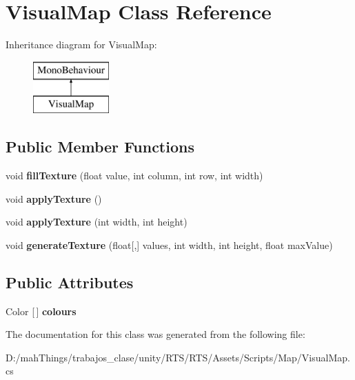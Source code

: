 \hypertarget{class_visual_map}{}\section{Visual\+Map Class Reference}
\label{class_visual_map}
Inheritance diagram for Visual\+Map\+:\begin{figure}[H]
\begin{center}
\leavevmode
\includegraphics[height=2.000000cm]{class_visual_map}
\end{center}
\end{figure}
\subsection*{Public Member Functions}
\begin{DoxyCompactItemize}
\item 
\mbox{\label{class_visual_map_a685aeff1a60eb854797e4b449ab68203}} 
void {\bfseries fill\+Texture} (float value, int column, int row, int width)
\item 
\mbox{\label{class_visual_map_ae7e29556b9ced1e31193c0baf64db2d6}} 
void {\bfseries apply\+Texture} ()
\item 
\mbox{\label{class_visual_map_a746cb4cc4977abb5f952f29e6095cf85}} 
void {\bfseries apply\+Texture} (int width, int height)
\item 
\mbox{\label{class_visual_map_a0adc17e3e2ce0b909c1f99c14056490a}} 
void {\bfseries generate\+Texture} (float\mbox{[},\mbox{]} values, int width, int height, float max\+Value)
\end{DoxyCompactItemize}
\subsection*{Public Attributes}
\begin{DoxyCompactItemize}
\item 
\mbox{\label{class_visual_map_a3a25edd83daa0a3fd85c20ee2af716f6}} 
Color \mbox{[}$\,$\mbox{]} {\bfseries colours}
\end{DoxyCompactItemize}


The documentation for this class was generated from the following file\+:\begin{DoxyCompactItemize}
\item 
D\+:/mah\+Things/trabajos\+\_\+clase/unity/\+R\+T\+S/\+R\+T\+S/\+Assets/\+Scripts/\+Map/Visual\+Map.\+cs\end{DoxyCompactItemize}
